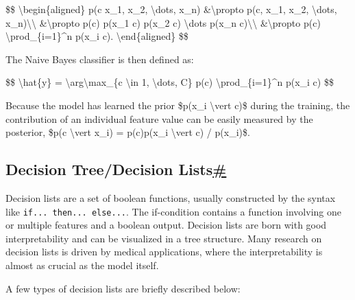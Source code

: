\$\$ \textbackslash begin\{aligned\} p(c \textbar{} x\_1, x\_2, \textbackslash dots, x\_n) \&\textbackslash propto p(c, x\_1, x\_2, \textbackslash dots, x\_n)\textbackslash\textbackslash{} \&\textbackslash propto p(c) p(x\_1 \textbar{} c) p(x\_2 \textbar{} c) \textbackslash dots p(x\_n \textbar{} c)\textbackslash\textbackslash{} \&\textbackslash propto p(c) \textbackslash prod\_\{i=1\}\^{}n p(x\_i \textbar{} c). \textbackslash end\{aligned\} \$\$

The Naive Bayes classifier is then defined as:

\$\$ \textbackslash hat\{y\} = \textbackslash arg\textbackslash max\_\{c \textbackslash in 1, \textbackslash dots, C\} p(c) \textbackslash prod\_\{i=1\}\^{}n p(x\_i \textbar{} c) \$\$

Because the model has learned the prior \$p(x\_i \textbackslash vert c)\$ during the training, the contribution of an individual feature value can be easily measured by the posterior, \$p(c \textbackslash vert x\_i) = p(c)p(x\_i \textbackslash vert c) / p(x\_i)\$.

\subsection{\texorpdfstring{Decision Tree/Decision Lists\hyperref[decision-treedecision-lists]{\#}}{Decision Tree/Decision Lists\#}}\label{decision-treedecision-lists}

Decision lists are a set of boolean functions, usually constructed by the syntax like \texttt{if...\ then...\ else...}. The if-condition contains a function involving one or multiple features and a boolean output. Decision lists are born with good interpretability and can be visualized in a tree structure. Many research on decision lists is driven by medical applications, where the interpretability is almost as crucial as the model itself.

A few types of decision lists are briefly described below:

